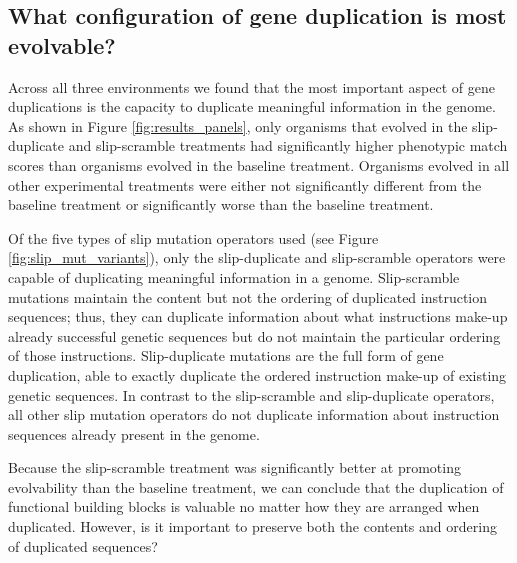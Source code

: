 

\subsection{What configuration of gene duplication is most evolvable?}
Across all three environments
we found that the most important aspect of gene duplications is the capacity to duplicate meaningful information in the genome. As shown in Figure \ref{fig:results_panels}, %
only organisms that evolved in the slip-duplicate and slip-scramble treatments had significantly higher phenotypic match scores than organisms evolved in the baseline treatment.
Organisms evolved in all other experimental treatments were either not significantly different from the baseline treatment or significantly worse than the baseline treatment.

Of the five types of slip mutation operators used (see Figure \ref{fig:slip_mut_variants}), only the slip-duplicate and slip-scramble operators were capable of duplicating meaningful information in a genome.
Slip-scramble mutations maintain the content but not the ordering of duplicated instruction sequences; thus, they can duplicate information about what instructions make-up already successful genetic sequences but do not maintain the particular ordering of those instructions. Slip-duplicate mutations are the full form of gene duplication, %
able to exactly duplicate the ordered instruction make-up of existing genetic sequences. In contrast to the slip-scramble and slip-duplicate operators, all other slip mutation operators do not duplicate information about instruction sequences already present in the genome.

Because the slip-scramble treatment was significantly better at promoting evolvability than the baseline treatment, we can conclude that the duplication of functional building blocks is valuable no matter how they are arranged when duplicated. However, is %
it important to
preserve both the contents and ordering of duplicated sequences?

